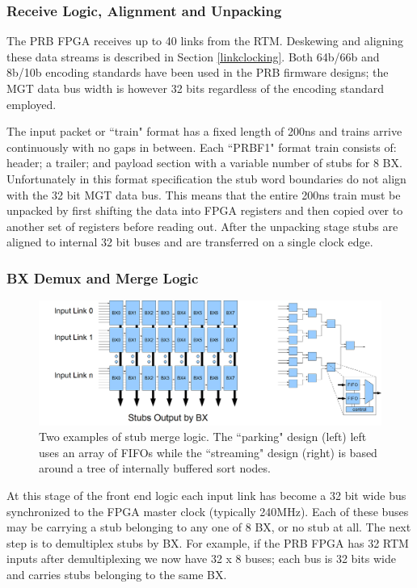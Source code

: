 \documentclass[letterpaper]{article}
\begin{document}
\subsubsection {Receive Logic, Alignment and Unpacking}

The PRB FPGA receives up to 40 links from the RTM.  Deskewing and aligning these data streams is described in Section \ref{linkclocking}.  Both 64b/66b and 8b/10b encoding standards have been used in the PRB firmware designs; the MGT data bus width is however 32 bits regardless of 
the encoding standard employed.

The input packet or ``train" format has a fixed length of 200ns and trains arrive continuously with no gaps in between.  Each ``PRBF1" format train consists of: header; a trailer; and payload section with a variable number of stubs for 8 BX.  Unfortunately in this format specification the stub word boundaries do not align with the 32 bit MGT data bus.  This means that the entire 200ns train must be unpacked by first shifting the data into FPGA registers and then copied over to another set of registers before reading out.  After the unpacking stage stubs are aligned to internal 32 bit buses and are transferred on a single clock edge.

\subsubsection {BX Demux and Merge Logic}
\label{merge_logic_section}

\begin{figure}
\centering
\includegraphics[width=14cm]{merge.png}
\caption{Two examples of stub merge logic. The ``parking" design (left) left uses an array of FIFOs while the ``streaming" design (right) is based around a tree of internally buffered sort nodes.}
\label{mergelogic}
\end{figure}

At this stage of the front end logic each input link has become a 32 bit wide bus synchronized to the FPGA master clock (typically 240MHz).  Each of these buses may be carrying a stub belonging to any one of 8 BX, or no stub at all.  The next step is to demultiplex stubs by BX.  For example, if the PRB FPGA has 32 RTM inputs after demultiplexing we now have 32 x 8 buses; each bus is 32 bits wide and carries stubs belonging to the same BX.
\end{document}
